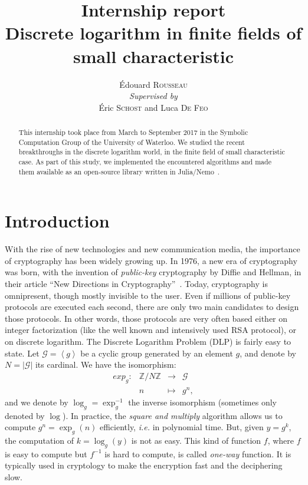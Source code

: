\documentclass[a4paper,11pt]{article}
\title{Internship report\\\textbf{Discrete logarithm in finite fields of
small characteristic}}
\author{Édouard \textsc{Rousseau}\\\textit{Supervised by}\\Éric \textsc{Schost} and Luca
\textsc{De Feo}}
\theoremstyle{break}
\theoremstyle{sc}
\theoremstyle{definition}
\theoremstyle{remark}
\newcommand{\ie}{\emph{i.e. }}
\begin{document}
\maketitle

\begin{abstract}
This internship took place from March to September 2017 in the Symbolic
Computation Group of the University of Waterloo. We studied the recent
breakthroughs in the discrete logarithm world, in the finite field of small characteristic case.
As part of this study, we implemented the encountered algorithms and made them
available as an open-source library written in Julia/Nemo~\cite{Julia, Nemo}.
\end{abstract}

\tableofcontents

\clearpage

\section{Introduction}

With the rise of new technologies and new communication media, the importance of
cryptography has been widely growing up. In 1976, a new era of cryptography was
born, with the invention of \emph{public-key} cryptography by Diffie and
Hellman, in their article ``New Directions in Cryptography''~\cite{DH76}. Today,
cryptography is omnipresent, though mostly invisible to the user. Even if
millions of public-key protocols are executed each second, there are only two
main candidates to design those protocols. In other words, those protocols are
very often based either on integer factorization (like the well known
and intensively used RSA protocol), or on discrete logarithm. The Discrete
Logarithm Problem (DLP) is fairly easy to state. Let $\mathcal G=\left\langle
g\right\rangle$ be a cyclic group generated by an element
$g$, and denote by $N=|\mathcal G|$ its cardinal. We have the isomorphism:
\[
 \begin{array}{cccc}
   exp_g: & \mathbb{Z}/N\mathbb{Z} & \to & \mathcal G \\
   & n & \mapsto & g^n,
 \end{array}
\]
and we denote by $\log_g=\exp_g^{-1}$ the inverse isomorphism (sometimes only
denoted by $\log$). In practice, the
\emph{square and multiply} algorithm allows us to compute $g^n=\exp_g(n)$
efficiently, \ie in polynomial time. But, given $y = g^k$, the computation of $k
= \log_g(y)$ is not as easy. This kind of function $f$, where $f$ is easy to
compute but $f^{-1}$ is hard to compute, is called \emph{one-way} function.
It is
typically used in cryptology to make the encryption fast and the deciphering
slow. 
\end{document}
